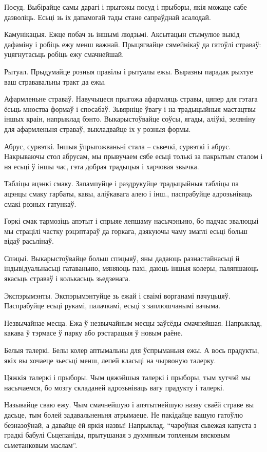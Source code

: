 Посуд.
Выбірайце самы дарагі і прыгожы посуд і прыборы, якія можаце сабе дазволіць. Есьці зь іх дапамогай тады стане сапраўднай асалодай.

Камунікацыя.
Ежце побач зь іншымі людзьмі. Аксытацын стымулюе выкід дафаміну і робіць ежу менш важнай. Прыцягвайце сямейнікаў да гатоўлі страваў: уцягнутасьць робіць ежу смачнейшай.

Рытуал.
Прыдумайце розныя правілы і рытуалы ежы. Выразны парадак рыхтуе ваш стрававальны тракт да ежы.

Афармленьне страваў.
Навучыцеся прыгожа афармляць стравы, цяпер для гэтага ёсьць мноства формаў і спосабаў. Зьвярніце ўвагу і на традыцыйныя мастацтвы іншых краін, напрыклад бэнто. Выкарыстоўвайце соўсы, ягады, аліўкі, зеляніну для афармленьня страваў, выкладвайце іх у розныя формы.

Абрус, сурвэткі.
Іншыя ўпрыгожваньні стала – сьвечкі, сурвэткі і абрус. Накрываючы стол абрусам, мы прывучаем сябе есьці толькі за пакрытым сталом і ня есьці ў іншы час, гэта добрая традыцыя і харчовая звычка.

Табліцы ацэнкі смаку.
Запампуйце і раздрукуйце традыцыйныя табліцы па ацэнцы смаку гарбаты, кавы, аліўкавага алею і інш., паспрабуйце адрозьніваць смакі розных гатункаў.

Горкі смак тармозіць апэтыт і спрыяе лепшаму насычэньню, бо падчас эвалюцыі мы страцілі частку рэцэптараў да горкага, дзякуючы чаму змаглі есьці больш відаў расьлінаў.

Спэцыі.
Выкарыстоўвайце больш спэцыяў, яны дадаюць разнастайнасьці й індывідуальнасьці гатаваньню, мяняюць пахі, даюць іншыя колеры, паляпшаюць якасьць страваў і колькасьць зьедзенага.

Экспэрымэнты.
Экспэрымэнтуйце зь ежай і сваімі ворганамі пачуцьцяў. Паспрабуйце есьці рукамі, палачкамі, есьці з заплюшчанымі вачыма.

Незвычайнае месца.
Ежа ў незвычайным месцы заўсёды смачнейшая. Напрыклад, какава ў тэрмасе ў парку або рэстарацыя ў новым раёне.

Белыя талеркі.
Белы колер аптымальны для ўспрыманьня ежы. А вось прадукты, якіх вы хочаеце зьесьці менш, лепей класьці на чырвоную талерку.

Цяжкія талеркі і прыборы.
Чым цяжэйшыя талеркі і прыборы, тым хутчэй мы насычаемся, бо мозгу складаней адрозьніваць вагу прадукту і талеркі.

Называйце сваю ежу.
Чым смачнейшую і апэтытнейшую назву сваёй страве вы дасьце, тым болей задавальненьня атрымаеце. Не пакідайце вашую гатоўлю безназоўнай, а давайце ёй яркія назвы! Напрыклад, “чароўная сьвежая капуста з градкі бабулі Сьцепаніды, прытушаная з духмяным топленым вясковым сьметанковым маслам”.

